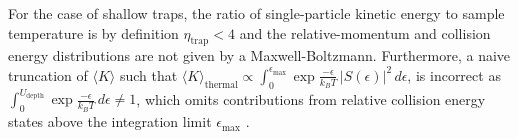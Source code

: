 
For the case of shallow traps, the ratio of single-particle kinetic energy to sample temperature is by definition $\eta_\text{trap} < 4$ and the relative-momentum and collision energy distributions are not given by a Maxwell-Boltzmann.
Furthermore, a naive truncation of $\langle K \rangle$ such that $\langle K \rangle_\text{thermal} \propto \displaystyle \int_0^{\epsilon_\text{max}} \exp{\frac{-\epsilon}{k_B T}}\,\vert S(\epsilon) \vert^2 \, d\epsilon$, is incorrect as $\displaystyle \int_0^{U_\text{depth}} \exp{\frac{-\epsilon}{k_B T}}\, d\epsilon \neq 1$, which omits contributions from relative collision energy states above the integration limit $\epsilon_\text{max}$ \cite{MartinezDeEscobar2008}.

